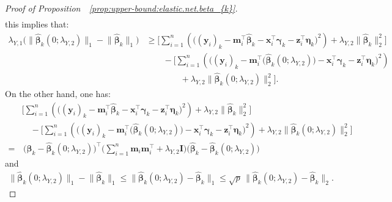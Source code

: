 \documentclass[
  12pt]{article}
\def\M{\mathbf{m}}
\def\X{\mathbf{x}}
\def\Y{\mathbf{y}}
\def\Z{\mathbf{z}}
\begin{document}
\begin{proof}[Proof of Proposition~~\ref{prop:upper-bound:elastic.net.beta_{k}}]
\begin{align*}
	\end{align*}
	this implies that:  
	\begin{align}
		\lambda_{Y,1}  \Big(   \big\|   \widehat{\bm{\beta}}_{k} (0;\lambda_{Y,2})    \big\|_{1}  -  \big\|   \widehat{\bm{\beta}}_{k}    \big\|_{1}   \Big)  
		&\geq      
		\Big[ \sum_{i=1}^{n}  \left(  \big(  (\Y_{i})_{k}   -    \M_{i}^{\top} \widehat{\bm{\beta}}_{k}  -   \X_{i}^{\top} \bm{\gamma}_{k}   -   \Z_{i}^{\top} \bm{\eta}_{k}     
		\big)^{2}   
		\right)   
		+   \lambda_{Y,2}    \big\|   \widehat{\bm{\beta}}_{k}    \big\|_{2}^{2} \Big]   
		\nonumber    
		\\
		& \qquad - \Big[     \sum_{i=1}^{n}  \left(   \big(  (\Y_{i})_{k}   -     \M_{i} ^{\top}\big(   \widehat{\bm{\beta}}_{k} (  0 ; \lambda_{Y,2}  )   \big)  -   \X_{i}^{\top} \bm{\gamma}_{k}   -   \Z_{i}^{\top} \bm{\eta}_{k}     
		\big)^{2}   
		\right)    \nonumber  
		\\
		& \qquad  \qquad  +    \lambda_{Y,2}    \big\|   \widehat{\bm{\beta}}_{k} ( 0 ; \lambda_{Y,2}  )    \big\|_{2}^{2} \Big].  
	\end{align}
	On the other hand, one has:
	\begin{align*}
		&\Big[ \sum_{i=1}^{n} \left(  \big(  (\Y_{i})_{k}   -    \M_{i}^{\top} \widehat{\bm{\beta}}_{k}  -   \X_{i}^{\top} \bm{\gamma}_{k}   -    \Z_{i}^{\top}\bm{\eta}_{k}  \big)^{2}   
		\right)   +   \lambda_{Y,2}  \big\|   \widehat{\bm{\beta}}_{k}   \big\|_{2}^{2} \Big]  
		\\
		& \quad - \Big[    \sum_{i=1}^{n}  \left(   \big(  (\Y_{i})_{k}   -   \M_{i} ^{\top}\big(   \widehat{\bm{\beta}}_{k} (  0 ; \lambda_{Y,2}  )   \big)  -   \X_{i}^{\top} \bm{\gamma}_{k}   -   \Z_{i}^{\top} \bm{\eta}_{k}   
		\big)^{2}  \right)   
		+   \lambda_{Y,2}    \big\|   \widehat{\bm{\beta}}_{k} ( 0 ; \lambda_{Y,2}  )    \big\|_{2}^{2} \Big]
		\\
		=& \, \Big( \widehat{\bm{\beta}}_{k}  - \widehat{\bm{\beta}}_{k} (0 ; \lambda_{Y,2})  \Big)^{\top}  
		\Big( \sum_{i=1}^{n}  \M_{i} \M_{i}^{\top} 
		+ \lambda_{Y,2} \mathbf{I}  \Big) 
		\Big( \widehat{\bm{\beta}}_{k}  - \widehat{\bm{\beta}}_{k} (0 ; \lambda_{Y,2})  \Big)
	\end{align*}   
	and 
	\begin{align*}
		\big\|   \widehat{\bm{\beta}}_{k} (0;\lambda_{Y,2})    \big\|_{1}   -    \big\|   \widehat{\bm{\beta}}_{k}    \big\|_{1}    \leq   \big\|   \widehat{\bm{\beta}}_{k} (0;\lambda_{Y,2})      -   \widehat{\bm{\beta}}_{k}    \big\|_{1}  \leq  \sqrt{p}  \,   \big\|   \widehat{\bm{\beta}}_{k} (0;\lambda_{Y,2})      -   \widehat{\bm{\beta}}_{k}    \big\|_{2} . 

\end{align*}
\end{proof}
\end{document}
